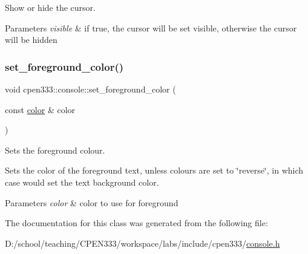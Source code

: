 Show or hide the cursor. 


\begin{DoxyParams}{Parameters}
{\em visible} & if {\ttfamily true}, the cursor will be set visible, otherwise the cursor will be hidden \\
\hline
\end{DoxyParams}
\mbox{\label{classcpen333_1_1console_a0710a0e8e75562c189bcf81837f01fa4}} 
\subsubsection{\texorpdfstring{set\+\_\+foreground\+\_\+color()}{set\_foreground\_color()}}
{\footnotesize\ttfamily void cpen333\+::console\+::set\+\_\+foreground\+\_\+color (\begin{DoxyParamCaption}\item[{const \hyperlink{console_8h_a915749711f4fc63cca8581af0c1106b3}{color} \&}]{color }\end{DoxyParamCaption})\hspace{0.3cm}{\ttfamily [inline]}}



Sets the foreground colour. 

Sets the color of the foreground text, unless colours are set to \char`\"{}reverse\char`\"{}, in which case would set the text background color.


\begin{DoxyParams}{Parameters}
{\em color} & color to use for foreground \\
\hline
\end{DoxyParams}


The documentation for this class was generated from the following file\+:\begin{DoxyCompactItemize}
\item 
D\+:/school/teaching/\+C\+P\+E\+N333/workspace/labs/include/cpen333/\hyperlink{console_8h}{console.\+h}\end{DoxyCompactItemize}
